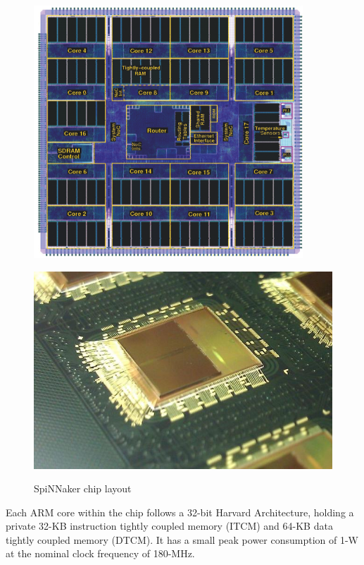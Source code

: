\begin{figure}
\centering
\begin{minipage}{.7\textwidth}
  \centering
  \includegraphics[width=0.9\textwidth, natwidth=608, natheight=571]{images/chip.png}
  \caption{SpiNNaker chip layout}
  \label{fig:chip_layout}
\end{minipage}
\begin{minipage}{.3\textwidth}
  \centering
  \includegraphics[width=0.9\linewidth, natwidth=640, natheight=422]{images/spinn_dies.jpg}
  \label{fig:spinn_dies}
\end{minipage}
\end{figure}

Each ARM core within the chip follows a 32-bit Harvard Architecture, holding a private 32-KB instruction tightly coupled memory (ITCM) and 64-KB data tightly coupled memory (DTCM).\cite{painkras} It has a small peak power consumption of 1-W at the nominal clock frequency of 180-MHz.\cite{arm968}

